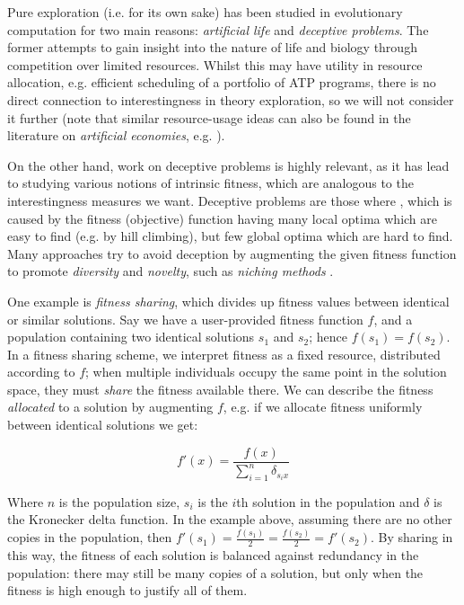 Pure exploration (i.e. for its own sake) has been studied in evolutionary computation for two main reasons: \emph{artificial life} and \emph{deceptive problems}. The former attempts to gain insight into the nature of life and biology through competition over limited resources. Whilst this may have utility in resource allocation, e.g. efficient scheduling of a portfolio of ATP programs, there is no direct connection to interestingness in theory exploration, so we will not consider it further (note that similar resource-usage ideas can also be found in the literature on \emph{artificial economies}, e.g. \citep{baum2000evolution}).

On the other hand, work on deceptive problems is highly relevant, as it has lead to studying various notions of intrinsic fitness, which are analogous to the interestingness measures we want. Deceptive problems are those where  \citep{lehman2011abandoning}, which is caused by the fitness (objective) function having many local optima which are easy to find (e.g. by hill climbing), but few global optima which are hard to find. Many approaches try to avoid deception by augmenting the given fitness function to promote \emph{diversity} and \emph{novelty}, such as \emph{niching methods} \citep{sareni1998fitness}.

One example is \emph{fitness sharing}, which divides up fitness values between identical or similar solutions. Say we have a user-provided fitness function $f$, and a population containing two identical solutions $s_1$ and $s_2$; hence $f(s_1) = f(s_2)$. In a fitness sharing scheme, we interpret fitness as a fixed resource, distributed according to $f$; when multiple individuals occupy the same point in the solution space, they must \emph{share} the fitness available there. We can describe the fitness \emph{allocated} to a solution by augmenting $f$, e.g. if we allocate fitness uniformly between identical solutions we get:

$$f'(x) = \frac{f(x)}{\sum_{i=1}^n \delta_{s_i x}}$$

Where $n$ is the population size, $s_i$ is the $i$th solution in the population and $\delta$ is the Kronecker delta function. In the example above, assuming there are no other copies in the population, then $f'(s_1) = \frac{f(s_1)}{2} = \frac{f(s_2)}{2} = f'(s_2)$. By sharing in this way, the fitness of each solution is balanced against redundancy in the population: there may still be many copies of a solution, but only when the fitness is high enough to justify all of them.

